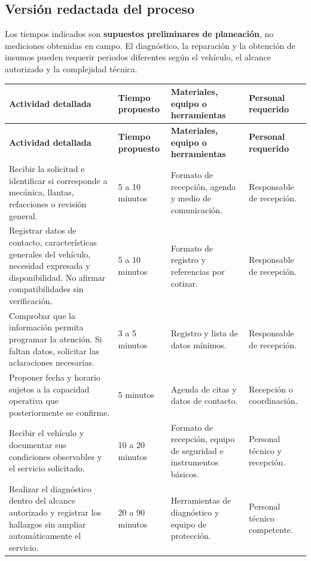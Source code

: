 \documentclass[12pt,letterpaper,oneside]{article}
\begin{document}
\subsection{Versión redactada del proceso}

Los tiempos indicados son \textbf{supuestos preliminares de planeación}, no mediciones obtenidas en campo. El diagnóstico, la reparación y la obtención de insumos pueden requerir periodos diferentes según el vehículo, el alcance autorizado y la complejidad técnica.

\begin{longtable}{|p{}|p{}|p{}|p{}|}
\hline
\textbf{Actividad detallada} & \textbf{Tiempo propuesto} & \textbf{Materiales, equipo o herramientas} & \textbf{Personal requerido} \\
\hline
\endfirsthead
\hline
\textbf{Actividad detallada} & \textbf{Tiempo propuesto} & \textbf{Materiales, equipo o herramientas} & \textbf{Personal requerido} \\
\hline
\endhead
Recibir la solicitud e identificar si corresponde a mecánica, llantas, refacciones o revisión general. & 5 a 10 minutos & Formato de recepción, agenda y medio de comunicación. & Responsable de recepción. \\
\hline
Registrar datos de contacto, características generales del vehículo, necesidad expresada y disponibilidad. No afirmar compatibilidades sin verificación. & 5 a 10 minutos & Formato de registro y referencias por cotizar. & Responsable de recepción. \\
\hline
Comprobar que la información permita programar la atención. Si faltan datos, solicitar las aclaraciones necesarias. & 3 a 5 minutos & Registro y lista de datos mínimos. & Responsable de recepción. \\
\hline
Proponer fecha y horario sujetos a la capacidad operativa que posteriormente se confirme. & 5 minutos & Agenda de citas y datos de contacto. & Recepción o coordinación. \\
\hline
Recibir el vehículo y documentar sus condiciones observables y el servicio solicitado. & 10 a 20 minutos & Formato de recepción, equipo de seguridad e instrumentos básicos. & Personal técnico y recepción. \\
\hline
Realizar el diagnóstico dentro del alcance autorizado y registrar los hallazgos sin ampliar automáticamente el servicio. & 20 a 90 minutos & Herramientas de diagnóstico y equipo de protección. & Personal técnico competente. \\

\end{longtable}
\end{document}
